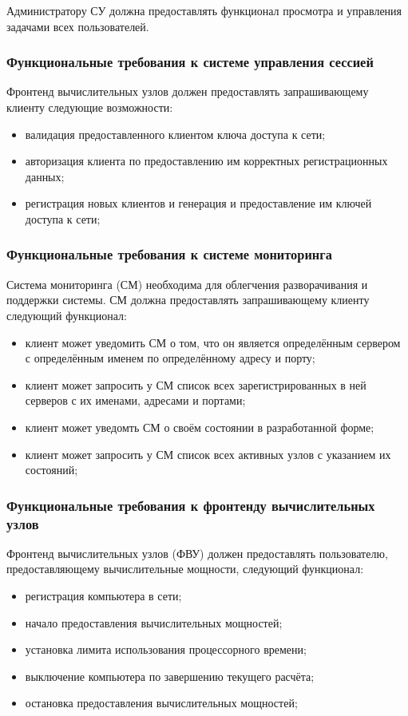 \documentclass[a4paper,12pt]{report}
\numberwithin{equation}{section}
\begin{document}
Администратору СУ должна предоставлять функционал просмотра и управления задачами всех пользователей.

\subsubsection{Функциональные требования к системе управления сессией}
Фронтенд вычислительных узлов должен предоставлять запрашивающему клиенту следующие возможности:
\begin{itemize}
    \item валидация предоставленного клиентом ключа доступа к сети;
    \item авторизация клиента по предоставлению им корректных регистрационных данных;
    \item регистрация новых клиентов и генерация и предоставление им ключей доступа к сети;
\end{itemize}

\subsubsection{Функциональные требования к системе мониторинга}
Система мониторинга (СМ) необходима для облегчения разворачивания и поддержки системы.
СМ должна предоставлять запрашивающему клиенту следующий функционал:
\begin{itemize}
  \item клиент может уведомить СМ о том, что он является определённым сервером с определённым именем по определённому адресу и порту;
  \item клиент может запросить у СМ список всех зарегистрированных в ней серверов с их именами, адресами и портами;
  \item клиент может уведомть СМ о своём состоянии в разработанной форме;
  \item клиент может запросить у СМ список всех активных узлов с указанием их состояний;
\end{itemize}

\subsubsection{Функциональные требования к фронтенду вычислительных узлов}
Фронтенд вычислительных узлов (ФВУ) должен предоставлять пользователю, предоставляющему вычислительные мощности, следующий функционал:
\begin{itemize}
    \item регистрация компьютера в сети;
    \item начало предоставления вычислительных мощностей;
    \item установка лимита использования процессорного времени;
    \item выключение компьютера по завершению текущего расчёта;
    \item остановка предоставления вычислительных мощностей;
\end{itemize}
\end{document}
